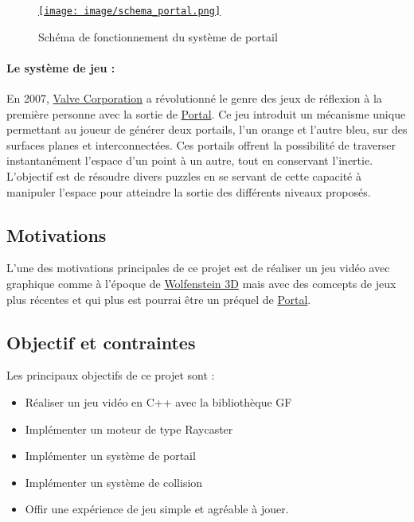 \documentclass[12pt]{report}
\begin{document}
\begin{figure}
	\centering
	\href{https://fr.wikipedia.org/wiki/Portal_(jeu_vid%C3%A9o)}{\texttt{[image: image/schema\_portal.png]}}
	\hspace*{-0.5cm}
	\caption{Schéma de fonctionnement du système de portail}
	\label{fig:schema_portal}
\end{figure}

\paragraph{Le système de jeu : }
En 2007, \href{https://fr.wikipedia.org/wiki/Valve_Corporation}{Valve Corporation} a révolutionné le genre des jeux 
de réflexion à la première personne avec la sortie de 
\href{https://fr.wikipedia.org/wiki/Portal_(jeu_vid%C3%A9o)}{Portal}. Ce jeu introduit un mécanisme unique 
permettant au joueur de générer deux portails, l'un orange et l'autre bleu, sur des surfaces planes et 
interconnectées. Ces portails offrent la possibilité de traverser instantanément l'espace d'un point à un autre, 
tout en conservant l'inertie. L'objectif est de résoudre divers puzzles en se servant de cette capacité à manipuler 
l'espace pour atteindre la sortie des différents niveaux proposés.



\subsection{Motivations}


L'une des motivations principales de ce projet est de réaliser un jeu vidéo
avec graphique comme à l'époque de \href{https://fr.wikipedia.org/wiki/Wolfenstein_3D}{Wolfenstein 3D} 
mais avec des comcepts de jeux plus récentes et qui plus est pourrai être
un préquel de \href{https://fr.wikipedia.org/wiki/Portal_(jeu_vid%C3%A9o)}{Portal}.


\subsection{Objectif et contraintes}

Les principaux objectifs de ce projet sont :
\begin{itemize}
	\item Réaliser un jeu vidéo en C++ avec la bibliothèque GF
	\item Implémenter un moteur de type Raycaster
	\item Implémenter un système de portail
	\item Implémenter un système de collision
	\item Offir une expérience de jeu simple et agréable à jouer.
\end{itemize}
\end{document}

